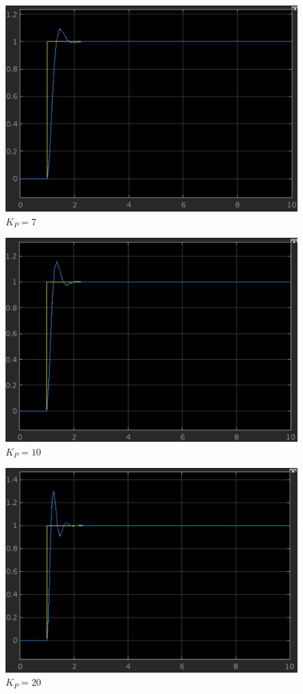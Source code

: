 \documentclass{article}
\begin{document}
				\begin{figure}[h]
					\includegraphics[scale=0.225, center]{2_b_2_KP_7.png}
					\caption{$K_P = 7$}
					\label{fig10: Graph_KP_7}
				\end{figure}
\newpage
				\begin{figure}[h]
					\includegraphics[scale=0.225, center]{2_b_2_KP_10.png}
					\caption{$K_P = 10$}
					\label{fig11: Graph_KP_10}
				\end{figure}
				\begin{figure}[h]
					\includegraphics[scale=0.225, center]{2_b_2_KP_20.png}
					\caption{$K_P = 20$}
					\label{fig12: Graph_KP_20}
				\end{figure}
\end{document}
